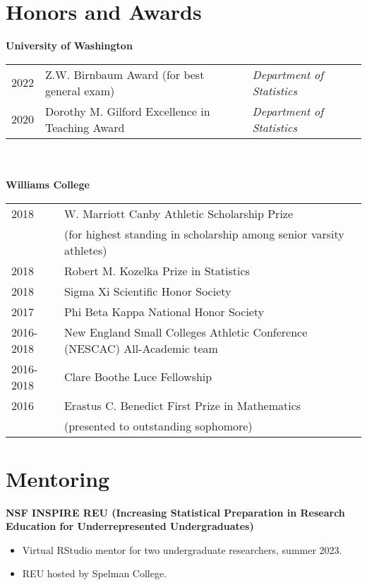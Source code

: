 \documentclass[margin, 10pt]{res} %
\begin{document}
\begin{resume}
\section{Honors and Awards}
\textbf{University of Washington} \\
\begin{tabular}{l l l}
2022 & Z.W. Birnbaum Award (for best general exam) & \emph{Department of Statistics} \\
2020 & Dorothy M. Gilford Excellence in Teaching Award & \emph{Department of Statistics}
\end{tabular}  \\
\\
\textbf{Williams College} \\
\begin{tabular}{l l }
2018 & W. Marriott Canby Athletic Scholarship Prize   \\
& (for highest standing in scholarship among senior varsity athletes) \\
2018 & Robert M. Kozelka Prize in Statistics   \\
2018&  Sigma Xi Scientific Honor Society \\
2017 & Phi Beta Kappa  National Honor Society \\
2016-2018 & New England Small Colleges Athletic Conference (NESCAC) All-Academic team \\
2016-2018 & Clare Boothe Luce Fellowship \\
2016 & Erastus C. Benedict First Prize in Mathematics \\
& (presented to outstanding sophomore) \\
\end{tabular}

\section{Mentoring}
{\textbf{NSF INSPIRE REU (Increasing Statistical Preparation in Research Education for Underrepresented Undergraduates)}}
\begin{itemize}
\item Virtual RStudio mentor for two undergraduate researchers, summer 2023. 
\item REU hosted by Spelman College. 
\end{itemize}



\end{resume}
\end{document}
